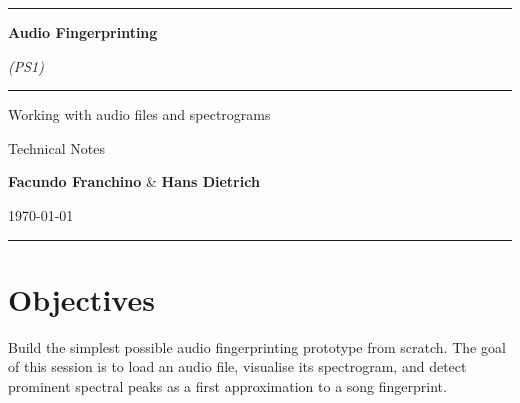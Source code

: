 \documentclass[12pt]{article}
\begin{document}
\begin{titlepage}
\begin{center}

\vspace*{2cm}

{\color{accent}\rule{\linewidth}{2pt}}

\vspace{1.5cm}

{\fontsize{42}{50}\selectfont\bfseries\color{darkbg} Audio Fingerprinting\\[6pt]}

\vspace{0.8cm}

{\Large\color{lightgray}\textit{(PS1)}}

\vspace{1.2cm}

{\color{accent}\rule{0.4\linewidth}{1pt}}

\vspace{1.5cm}

{\LARGE\color{darkbg} Working with audio files and spectrograms}

\vspace{0.6cm}

{\large\color{lightgray} Technical Notes}

\vspace{3cm}

\begin{minipage}{0.6\textwidth}
\centering
{\large\color{darkbg}\textbf{Facundo Franchino} \&{} \textbf{Hans Dietrich}}

\vspace{1cm}

{\color{lightgray}\today}
\end{minipage}

\vfill

{\color{accent}\rule{\linewidth}{2pt}}

\end{center}
\end{titlepage}



\section{Objectives}
Build the simplest possible audio fingerprinting prototype from scratch.  
The goal of this session is to load an audio file, visualise its spectrogram, 
and detect prominent spectral peaks as a first approximation to a song fingerprint.
\end{document}
